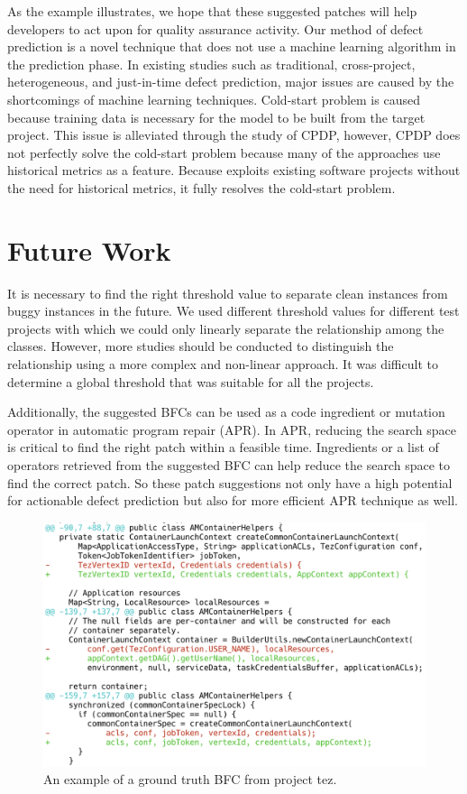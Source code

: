 As the example illustrates, we hope that these suggested patches will help developers to act upon for quality assurance activity.
Our method of defect prediction is a novel technique that does not use a machine learning algorithm in the prediction phase.
In existing studies such as traditional, cross-project, heterogeneous, and just-in-time defect prediction, major issues are caused by the shortcomings of machine learning techniques.
Cold-start problem is caused because training data is necessary for the model to be built from the target project.
This issue is alleviated through the study of CPDP, however, CPDP does not perfectly solve the cold-start problem because many of the approaches use historical metrics as a feature. 
Because {\simfinmo} exploits existing software projects without the need for historical metrics, it fully resolves the cold-start problem.


\section{Future Work}
It is necessary to find the right threshold value to separate clean instances from buggy instances in the future.
We used different threshold values for different test projects with which we could only linearly separate the relationship among the classes.
However, more studies should be conducted to distinguish the relationship using a more complex and non-linear approach.
It was difficult to determine a global threshold that was suitable for all the projects.

Additionally, the suggested BFCs can be used as a code ingredient or mutation operator in automatic program repair (APR).
In APR, reducing the search space is critical to find the right patch within a feasible time. Ingredients or a list of operators retrieved from the suggested BFC can help reduce the search space to find the correct patch.
So these patch suggestions not only have a high potential for actionable defect prediction but also for more efficient APR technique as well.

\begin{figure}[!tbp]
\renewcommand{\arraystretch}{1}
    \centering
    \includegraphics[width=\linewidth]{figures/ps1.png}\hfill
    \caption{An example of a ground truth BFC from project tez.}
    \label{fig:ps_1}
\end{figure}

